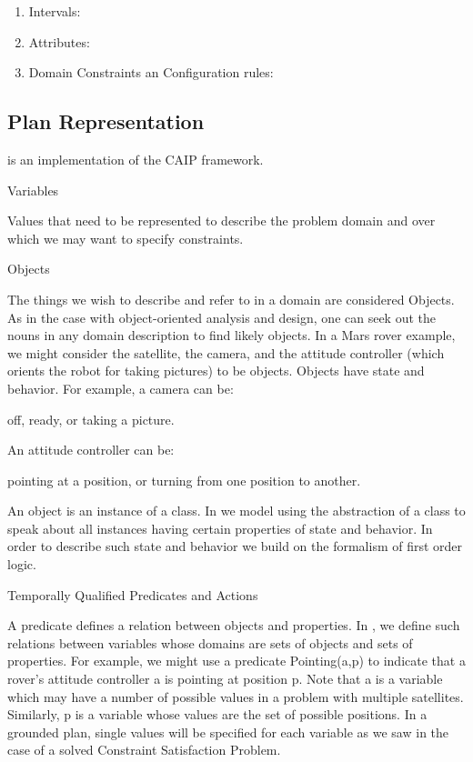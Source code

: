 \begin{enumerate}
	\item Intervals: 
	\item Attributes:
	\item Domain Constraints an Configuration rules:
\end{enumerate}


\subsection{\eu Plan Representation}
\label{sec:europa:pr}

\eu is an implementation of the CAIP framework.


Variables

Values that need to be represented to describe the problem domain and over which we may want to specify constraints.

Objects

The things we wish to describe and refer to in a domain are considered
Objects. As in the case with object-oriented analysis and design, one
can seek out the nouns in any domain description to find likely
objects. In a Mars rover example, we might consider the satellite, the
camera, and the attitude controller (which orients the robot for
taking pictures) to be objects. Objects have state and behavior. For
example, a camera can be:

    off,
    ready, or
    taking a picture. 

An attitude controller can be:

    pointing at a position, or
    turning from one position to another. 

    An object is an instance of a class. In \eu we model using the
    abstraction of a class to speak about all instances having certain
    properties of state and behavior. In order to describe such state
    and behavior we build on the formalism of first order logic.


Temporally Qualified Predicates and Actions

A predicate defines a relation between objects and properties. In
\eu, we define such relations between variables whose domains are
sets of objects and sets of properties. For example, we might use a
predicate Pointing(a,p) to indicate that a rover's attitude controller
a is pointing at position p. Note that a is a variable which may have
a number of possible values in a problem with multiple
satellites. Similarly, p is a variable whose values are the set of
possible positions. In a grounded plan, single values will be
specified for each variable as we saw in the case of a solved
Constraint Satisfaction Problem.

